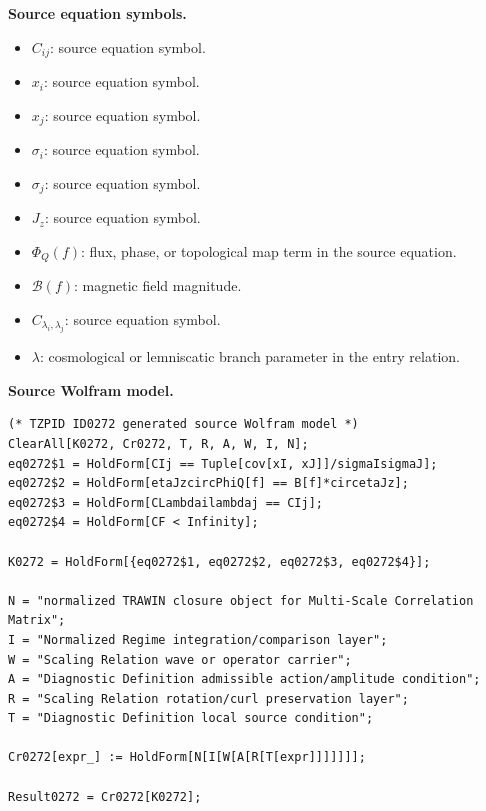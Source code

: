 \begin{minipage}[t]{0.49\linewidth}
\begingroup
\small
\raggedright
\textbf{Source equation symbols.}\par
\begin{itemize}[leftmargin=1.35em,itemsep=1pt,topsep=1pt,parsep=0pt]
    \item $C_{ij}$: source equation symbol.
    \item $x_i$: source equation symbol.
    \item $x_j$: source equation symbol.
    \item $\sigma_i$: source equation symbol.
    \item $\sigma_j$: source equation symbol.
    \item $J_z$: source equation symbol.
    \item $\Phi_Q(f)$: flux, phase, or topological map term in the source equation.
    \item $\mathcal{B}(f)$: magnetic field magnitude.
    \item $C_{\lambda_{i},\lambda_{j}}$: source equation symbol.
    \item $\lambda$: cosmological or lemniscatic branch parameter in the entry relation.
\end{itemize}
\endgroup
\end{minipage}\hfill
\begin{minipage}[t]{0.47\linewidth}
\begingroup
\scriptsize
\raggedright
\textbf{Source Wolfram model.}\par
\begin{Verbatim}[fontsize=\tiny,breaklines=true,breakanywhere=true]
(* TZPID ID0272 generated source Wolfram model *)
ClearAll[K0272, Cr0272, T, R, A, W, I, N];
eq0272$1 = HoldForm[CIj == Tuple[cov[xI, xJ]]/sigmaIsigmaJ];
eq0272$2 = HoldForm[etaJzcircPhiQ[f] == B[f]*circetaJz];
eq0272$3 = HoldForm[CLambdailambdaj == CIj];
eq0272$4 = HoldForm[CF < Infinity];

K0272 = HoldForm[{eq0272$1, eq0272$2, eq0272$3, eq0272$4}];

N = "normalized TRAWIN closure object for Multi-Scale Correlation Matrix";
I = "Normalized Regime integration/comparison layer";
W = "Scaling Relation wave or operator carrier";
A = "Diagnostic Definition admissible action/amplitude condition";
R = "Scaling Relation rotation/curl preservation layer";
T = "Diagnostic Definition local source condition";

Cr0272[expr_] := HoldForm[N[I[W[A[R[T[expr]]]]]]];

Result0272 = Cr0272[K0272];
\end{Verbatim}
\endgroup
\end{minipage}

